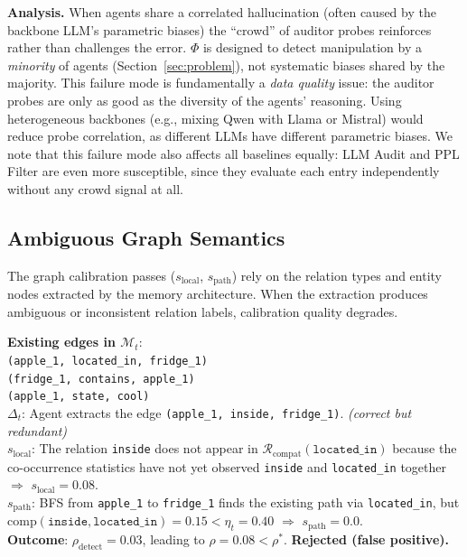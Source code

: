 \noindent
\textbf{Analysis.}
When agents share a correlated hallucination (often
caused by the backbone LLM's parametric biases) the
``crowd'' of auditor probes reinforces rather than
challenges the error.  $\Phi$ is designed to detect
manipulation by a \emph{minority} of agents
(Section~\ref{sec:problem}), not systematic biases
shared by the majority.  This failure mode is
fundamentally a \emph{data quality} issue: the
auditor probes are only as good as the diversity of
the agents' reasoning.  Using heterogeneous backbones
(e.g., mixing Qwen with Llama or Mistral) would
reduce probe correlation, as different LLMs have
different parametric biases.  We note that this
failure mode also affects all baselines equally: LLM Audit and PPL Filter are even more susceptible,
since they evaluate each entry independently without
any crowd signal at all.

\subsection{Ambiguous Graph Semantics}
\label{app:failure_graph}

The graph calibration passes ($s_{\text{local}}$,
$s_{\text{path}}$) rely on the relation types and
entity nodes extracted by the memory architecture.
When the extraction produces ambiguous or
inconsistent relation labels, calibration quality
degrades.

\begin{tcolorbox}[colback=gray!5, colframe=gray!60,
  title={\small Example: ALFWorld, AriGraph, Round 3},
  fonttitle=\bfseries\small, boxrule=0.4pt,
  arc=1.5mm]
\small
\textbf{Existing edges in $\mathcal{M}_t$}:\\
\texttt{(apple\_1, located\_in, fridge\_1)}\\
\texttt{(fridge\_1, contains, apple\_1)}\\
\texttt{(apple\_1, state, cool)}\\[3pt]
\textbf{$\Delta_t$}: Agent extracts the edge
\texttt{(apple\_1, inside, fridge\_1)}.
\hfill\textit{(correct but redundant)}\\[3pt]
\textbf{$s_{\text{local}}$}: The relation
\texttt{inside} does not appear in
$\mathcal{R}_{\text{compat}}(\texttt{located\_in})$
because the co-occurrence statistics have not yet
observed \texttt{inside} and \texttt{located\_in}
together $\Rightarrow$ $s_{\text{local}} = 0.08$.\\[3pt]
\textbf{$s_{\text{path}}$}: BFS from
\texttt{apple\_1} to \texttt{fridge\_1} finds the
existing path via \texttt{located\_in}, but
$\text{comp}(\texttt{inside},
\texttt{located\_in}) = 0.15 < \eta_t = 0.40$
$\Rightarrow$ $s_{\text{path}} = 0.0$.\\[3pt]
\textbf{Outcome}: $\rho_{\text{detect}} = 0.03$,
leading to $\rho = 0.08 < \rho^*$.
\textbf{Rejected (false positive).}
\end{tcolorbox}

